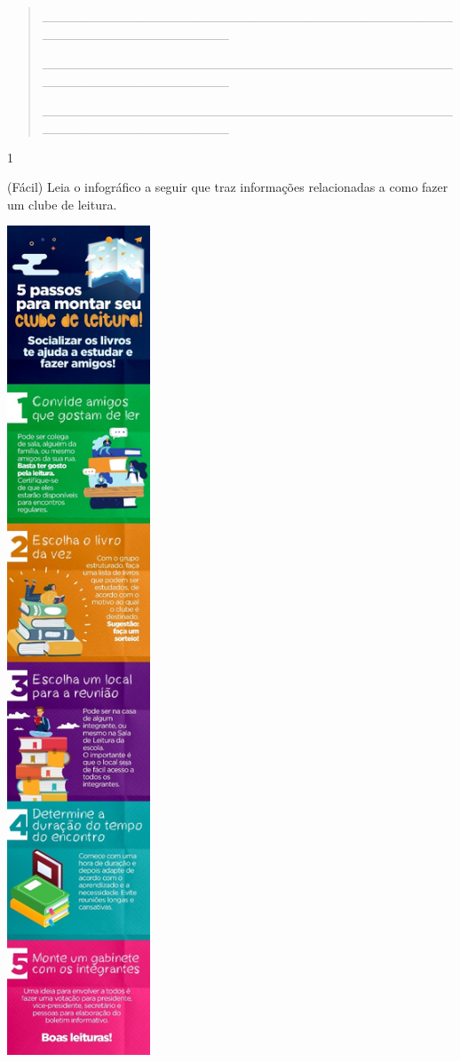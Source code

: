 \begin{itemize}
{{{\begin{itemize}
\begin{itemize}
\begin{itemize}
\begin{quote}
\_\_\_\_\_\_\_\_\_\_\_\_\_\_\_\_\_\_\_\_\_\_\_\_\_\_\_\_\_\_\_\_\_\_\_\_\_\_\_\_\_\_\_\_\_\_\_\_\_\_\_\_\_\_\_\_\_\_\_\_\_\_\_\_

\_\_\_\_\_\_\_\_\_\_\_\_\_\_\_\_\_\_\_\_\_\_\_\_\_\_\_\_\_\_\_\_\_\_\_\_\_\_\_\_\_\_\_\_\_\_\_\_\_\_\_\_\_\_\_\_\_\_\_\_\_\_\_\_

\_\_\_\_\_\_\_\_\_\_\_\_\_\_\_\_\_\_\_\_\_\_\_\_\_\_\_\_\_\_\_\_\_\_\_\_\_\_\_\_\_\_\_\_\_\_\_\_\_\_\_\_\_\_\_\_\_\_\_\_\_\_\_\_
\end{quote}


\num{1}

(Fácil) Leia o infográfico a seguir que traz informações relacionadas a
como fazer um clube de leitura.

\includegraphics[width=1.67569in,height=9.72500in]{media/image32.jpeg}


\end{itemize}
\end{itemize}
\end{itemize}}}}
\end{itemize}
